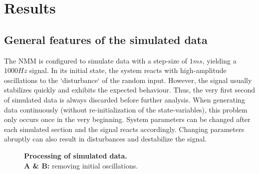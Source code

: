 \chapter{Results}\label{ch:results}


\section{General features of the simulated data}\label{sec:general-features-of-the-simulated-data}

The NMM is configured to simulate data with a step-size of $1 ms$, yielding a $1000 Hz$ signal.
In its initial state, the system reacts with high-amplitude oscillations to the `disturbance` of the random input.
However, the signal usually stabilizes quickly and exhibits the expected behaviour.
Thus, the very first second of simulated data is always discarded before further analysis.
When generating data continuously (without re-initialization of the state-variables),
this problem only occurs once in the very beginning.
System parameters can be changed after each simulated section and the signal reacts accordingly.
Changing parameters abruptly can also result in disturbances and destabilize the signal.

\begin{figure}[H]
    \centering

    \caption{\textbf{Processing of simulated data.}\\ \textbf{A \& B:} removing initial oscillations.}
    \label{fig:initial_oscilations}
\end{figure}



